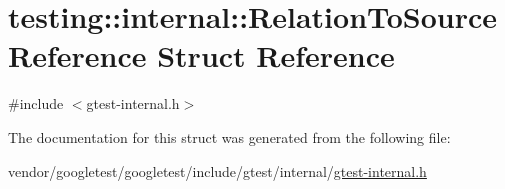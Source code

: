 \hypertarget{structtesting_1_1internal_1_1_relation_to_source_reference}{}\section{testing\+:\+:internal\+:\+:Relation\+To\+Source\+Reference Struct Reference}
\label{structtesting_1_1internal_1_1_relation_to_source_reference}


{\ttfamily \#include $<$gtest-\/internal.\+h$>$}



The documentation for this struct was generated from the following file\+:\begin{DoxyCompactItemize}
\item 
vendor/googletest/googletest/include/gtest/internal/\hyperlink{gtest-internal_8h}{gtest-\/internal.\+h}\end{DoxyCompactItemize}
